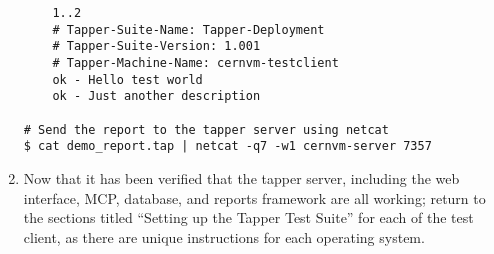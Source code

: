 \begin{enumerate}
\begin{lstlisting}
	1..2
	# Tapper-Suite-Name: Tapper-Deployment
	# Tapper-Suite-Version: 1.001
	# Tapper-Machine-Name: cernvm-testclient
	ok - Hello test world
	ok - Just another description

# Send the report to the tapper server using netcat
$ cat demo_report.tap | netcat -q7 -w1 cernvm-server 7357
\end{lstlisting}

\item	Now that it has been verified that the tapper server, including the web interface, MCP, database, and reports framework 
		are all working; return to the sections titled ``Setting up the Tapper Test Suite''	for each of the test client, as 
		there are unique instructions for each operating system.
\end{enumerate}